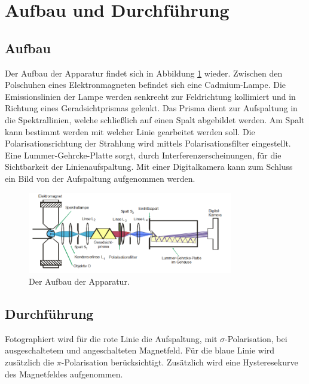 \section{Aufbau und Durchführung}
\label{sec:Durchführung}
\subsection{Aufbau}
Der Aufbau der Apparatur findet sich in Abbildung \ref{fig:aufbau} wieder.
Zwischen den Polschuhen eines Elektronmagneten befindet sich eine Cadmium-Lampe.
Die Emissionslinien der Lampe werden senkrecht zur Feldrichtung kollimiert und
in Richtung eines Geradsichtprismas gelenkt.
Das Prisma dient zur Aufspaltung in die Spektrallinien,
welche schließlich auf einen Spalt abgebildet werden.
Am Spalt kann bestimmt werden mit welcher Linie gearbeitet werden soll.
Die Polarisationsrichtung der Strahlung wird mittels Polarisationsfilter eingestellt.
Eine Lummer-Gehrcke-Platte sorgt, durch Interferenzerscheinungen, für die Sichtbarkeit der Linienaufspaltung.
Mit einer Digitalkamera kann zum Schluss ein Bild von der Aufspaltung aufgenommen werden.
\begin{figure}
   \centering
    \includegraphics[width=0.8\textwidth]{aufbau.PNG}
    \caption{Der Aufbau der Apparatur.\cite{skript}}
    \label{fig:aufbau}
\end{figure}
\subsection{Durchführung}
Fotographiert wird für die rote Linie die
Aufspaltung, mit $\sigma$-Polarisation, bei ausgeschaltetem und angeschalteten Magnetfeld.
Für die blaue Linie wird zusätzlich die $\pi$-Polarisation berücksichtigt.
Zusätzlich wird eine Hysteresekurve des Magnetfeldes aufgenommen.
